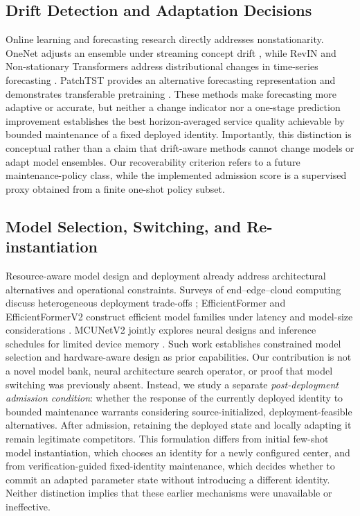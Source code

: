 \documentclass[journal]{IEEEtran}
\begin{document}
\subsection{Drift Detection and Adaptation Decisions}
Online learning and forecasting research directly addresses nonstationarity. OneNet adjusts an ensemble under streaming concept drift \cite{Zhang2023OneNet}, while RevIN and Non-stationary Transformers address distributional changes in time-series forecasting \cite{Kim2022RevIN,Liu2022NST}. PatchTST provides an alternative forecasting representation and demonstrates transferable pretraining \cite{Nie2023PatchTST}. These methods make forecasting more adaptive or accurate, but neither a change indicator nor a one-stage prediction improvement establishes the best horizon-averaged service quality achievable by bounded maintenance of a fixed deployed identity. Importantly, this distinction is conceptual rather than a claim that drift-aware methods cannot change models or adapt model ensembles. Our recoverability criterion refers to a future maintenance-policy class, while the implemented admission score is a supervised proxy obtained from a finite one-shot policy subset.

\subsection{Model Selection, Switching, and Re-instantiation}
Resource-aware model design and deployment already address architectural alternatives and operational constraints. Surveys of end--edge--cloud computing discuss heterogeneous deployment trade-offs \cite{Wang2024EndEdge}; EfficientFormer and EfficientFormerV2 construct efficient model families under latency and model-size considerations \cite{Li2022EfficientFormer,Li2023EfficientFormerV2}. MCUNetV2 jointly explores neural designs and inference schedules for limited device memory \cite{Lin2021MCUNetV2}. Such work establishes constrained model selection and hardware-aware design as prior capabilities. Our contribution is not a novel model bank, neural architecture search operator, or proof that model switching was previously absent. Instead, we study a separate \emph{post-deployment admission condition}: whether the response of the currently deployed identity to bounded maintenance warrants considering source-initialized, deployment-feasible alternatives. After admission, retaining the deployed state and locally adapting it remain legitimate competitors. This formulation differs from initial few-shot model instantiation, which chooses an identity for a newly configured center, and from verification-guided fixed-identity maintenance, which decides whether to commit an adapted parameter state without introducing a different identity. Neither distinction implies that these earlier mechanisms were unavailable or ineffective.
\end{document}
